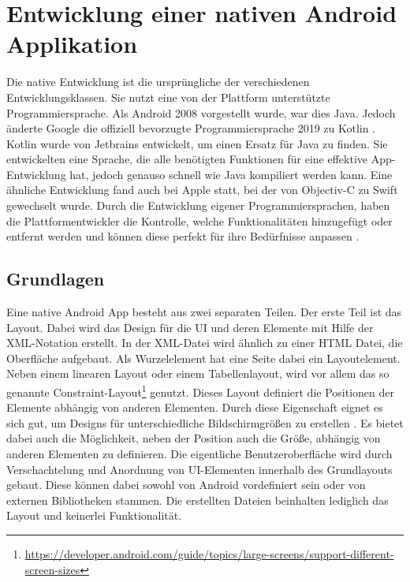 \section{Entwicklung einer nativen Android Applikation}
Die native Entwicklung ist die ursprüngliche der verschiedenen Entwicklungsklassen. Sie nutzt eine von der Plattform unterstützte Programmiersprache. Als Android 2008 vorgestellt wurde, war dies Java.
Jedoch änderte Google die offiziell bevorzugte Programmiersprache 2019 zu Kotlin \cite{android_standard}. 
Kotlin wurde von Jetbrains entwickelt, um einen Ersatz für Java zu finden. 
Sie entwickelten eine Sprache, die alle benötigten Funktionen für eine effektive App-Entwicklung hat, jedoch genauso schnell wie Java kompiliert werden kann\cite{medium_Swift_Kotlin}. 
Eine ähnliche Entwicklung fand auch bei Apple statt, bei der von Objectiv-C zu Swift gewechselt wurde. 
Durch die Entwicklung eigener Programmiersprachen, haben die Plattformentwickler die Kontrolle, welche Funktionalitäten hinzugefügt oder entfernt werden und können diese perfekt für ihre Bedürfnisse anpassen \cite{medium_Swift_Kotlin}.

\subsection{Grundlagen}
Eine native Android App besteht aus zwei separaten Teilen.
Der erste Teil ist das Layout. Dabei wird das Design für die UI und deren Elemente mit Hilfe der XML-Notation erstellt.
In der XML-Datei wird ähnlich zu einer HTML Datei, die Oberfläche aufgebaut. Als Wurzelelement hat eine Seite dabei ein Layoutelement. Neben einem linearen Layout oder einem Tabellenlayout, wird vor allem das so genannte Constraint-Layout\footnote{\url{https://developer.android.com/guide/topics/large-screens/support-different-screen-sizes}} genutzt. 
Dieses Layout definiert die Positionen der Elemente abhängig von anderen Elementen. Durch diese Eigenschaft eignet es sich gut, um Designs für unterschiedliche Bildschirmgrößen zu erstellen \cite{ConstraintLayout_Android}. Es bietet dabei auch die Möglichkeit, neben der Position auch die Größe, abhängig von anderen Elementen zu definieren.
Die eigentliche Benutzeroberfläche wird durch Verschachtelung und Anordnung von UI-Elementen innerhalb des Grundlayouts gebaut. Diese können dabei sowohl von Android vordefiniert sein oder von externen Bibliotheken stammen. Die erstellten Dateien beinhalten lediglich das Layout und keinerlei Funktionalität.

